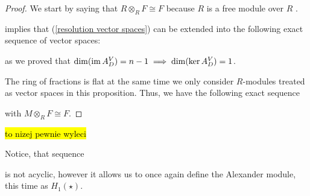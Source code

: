 \begin{proof} We start by saying that $R\otimes_R F\cong F$ because $R$ is a free module over $R$ \cite[Proposition~2.14]{atiyah}.

    implies that (\ref{resolution vector spaces}) can be extended into the following exact sequence of vector spaces:
   \begin{center}
   \end{center}
   as we proved that $\dim(\operatorname{im} A_D^V)=n-1\implies \dim(\ker A_D^V)=1$.

  The ring of fractions is flat \cite[Chapter~3]{atiyah} at the same time we only consider $R$-modules treated as vector spaces in this proposition. Thus, we have the following exact sequence
  \begin{center}
  \end{center}
  with $M\otimes_R F\cong F$.
\end{proof}

\hl{to nizej pewnie wyleci}

{\color{blue}Notice, that sequence
\begin{center}
\end{center}
is not acyclic, however it allows us to once again define the Alexander module, this time as $H_1(\star)$.}
